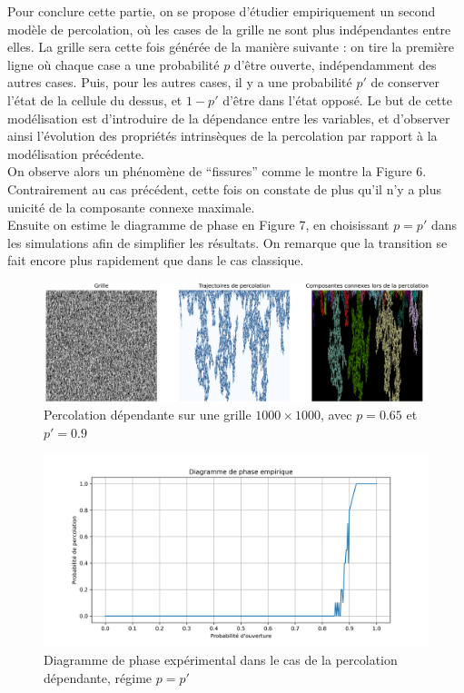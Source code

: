 \documentclass[11pt,a4paper]{article}
\begin{document}
Pour conclure cette partie, on se propose d'étudier empiriquement un second modèle de percolation, où les cases de la grille ne sont plus indépendantes entre elles. La grille sera cette fois générée de la manière suivante : on tire la première ligne où chaque case a une probabilité $p$ d'être ouverte, indépendamment des autres cases. Puis, pour les autres cases, il y a une probabilité $p'$ de conserver l'état de la cellule du dessus, et $1-p'$ d'être dans l'état opposé. Le but de cette modélisation est d'introduire de la dépendance entre les variables, et d'observer ainsi l'évolution des propriétés intrinsèques de la percolation par rapport à la modélisation précédente. \\
On observe alors un phénomène de ``fissures'' comme le montre la Figure 6. Contrairement au cas précédent, cette fois on constate de plus qu'il n'y a plus unicité de la composante connexe maximale. \\
Ensuite on estime le diagramme de phase en Figure 7, en choisissant $p=p'$ dans les simulations afin de simplifier les résultats. On remarque que la transition se fait encore plus rapidement que dans le cas classique.

\begin{figure}[htp]
    \centering
    \includegraphics[width=1 \textwidth]{./Pictures/fissure.png}
    \caption{Percolation dépendante sur une grille $1000\times 1000$, avec $p=0.65$ et $p'=0.9$}
    \label{fig:fissure}
\end{figure}


\begin{figure}[H]
    \centering
    \includegraphics[width=0.6 \textwidth]{./Pictures/phase_dep.png}
    \caption{Diagramme de phase expérimental dans le cas de la percolation dépendante, régime $p=p'$}
    \label{fig:phase_dep}
\end{figure}
\end{document}
